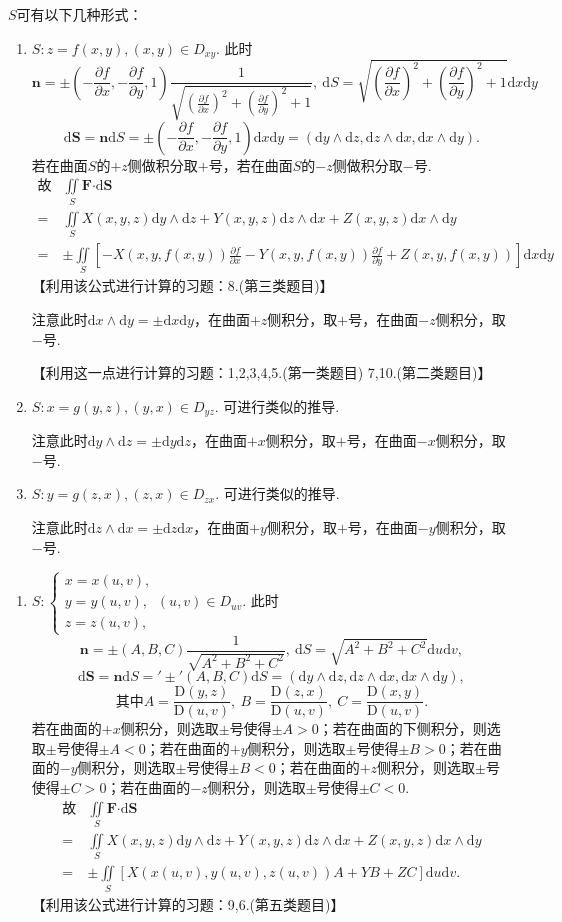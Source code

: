 \documentclass[12pt,UTF8,fleqn]{ctexart}
\newcommand{\md}[1]{\mathrm d#1}
\newcommand{\BSIInt}[2]{\iint\limits_{#1}#2}
\newcommand{\pp}[2]{\frac{\partial #1}{\partial #2}}
\begin{document}
$S$可有以下几种形式：
\begin{enumerate}
\begin{enumerate}
\item$S:z=f(x,y),(x,y)\in D_{xy}$. 此时
\setlength{\mathindent}{0cm}
\[\bm n=\pm(-\pp fx,-\pp fy,1)\frac1{\sqrt{(\pp fx)^2+(\pp fy)^2+1}},\ \md S=\sqrt{(\pp fx)^2+(\pp fy)^2+1}\md x\md y\]
\[\md\bm S=\bm n\md S=\pm(-\pp fx,-\pp fy,1)\md x\md y=(\md y\wedge\md z,\md z\wedge\md x,\md x\wedge\md y).\]
若在曲面$S$的$+z$侧做积分取$+$号，若在曲面$S$的$-z$侧做积分取$-$号.
\setlength{\mathindent}{0cm}
\[\begin{aligned}
\text{故}&\BSIInt S{\bm F\bm\cdot\md\bm S}\\
=&\BSIInt S{X(x,y,z)\md y\wedge\md z+Y(x,y,z)\md z\wedge\md x+Z(x,y,z)\md x\wedge\md y}\\
=&\pm\BSIInt S{[-X(x,y,f(x,y))\pp fx-Y(x,y,f(x,y))\pp fy+Z(x,y,f(x,y))]\md x\md y}
\end{aligned}\]
【利用该公式进行计算的习题：8.(第三类题目)】

注意此时$\md x\wedge\md y=\pm\md x\md y$，在曲面$+z$侧积分，取$+$号，在曲面$-z$侧积分，取$-$号.

【利用这一点进行计算的习题：1,2,3,4,5.(第一类题目) 7,10.(第二类题目)】
\item$S:x=g(y,z),(y,x)\in D_{yz}$. 可进行类似的推导.

注意此时$\md y\wedge\md z=\pm\md y\md z$，在曲面$+x$侧积分，取$+$号，在曲面$-x$侧积分，取$-$号.
\item$S:y=g(z,x),(z,x)\in D_{zx}$. 可进行类似的推导.

注意此时$\md z\wedge\md x=\pm\md z\md x$，在曲面$+y$侧积分，取$+$号，在曲面$-y$侧积分，取$-$号.
\end{enumerate}
\begin{enumerate}
\item[]$S:\begin{cases}
x=x(u,v),\\
y=y(u,v),\\
z=z(u,v),
\end{cases}(u,v)\in D_{uv}$. 此时
\setlength{\mathindent}{0cm}
\[\bm n=\pm(A,B,C)\frac1{\sqrt{A^2+B^2+C^2}},\ \md S=\sqrt{A^2+B^2+C^2}\md u\md v,\]
\[\md\bm S=\bm n\md S='\pm'(A,B,C)\md S=(\md y\wedge\md z,\md z\wedge\md x,\md x\wedge\md y),\]
\[\text{其中}A=\frac{\mathrm D(y,z)}{\mathrm D(u,v)},\ B=\frac{\mathrm D(z,x)}{\mathrm D(u,v)},\ C=\frac{\mathrm D(x,y)}{\mathrm D(u,v)}.\]
若在曲面的$+x$侧积分，则选取$\pm$号使得$\pm A>0$；若在曲面的下侧积分，则选取$\pm$号使得$\pm A<0$；若在曲面的$+y$侧积分，则选取$\pm$号使得$\pm B>0$；若在曲面的$-y$侧积分，则选取$\pm$号使得$\pm B<0$；若在曲面的$+z$侧积分，则选取$\pm$号使得$\pm C>0$；若在曲面的$-z$侧积分，则选取$\pm$号使得$\pm C<0$.
\setlength{\mathindent}{0cm}
\[\begin{aligned}
\text{故}&\BSIInt S{\bm F\bm\cdot\md\bm S}\\
=&\BSIInt S{X(x,y,z)\md y\wedge\md z+Y(x,y,z)\md z\wedge\md x+Z(x,y,z)\md x\wedge\md y}\\
=&\pm\BSIInt S{[X(x(u,v),y(u,v),z(u,v))A+YB+ZC]\md u\md v}.
\end{aligned}\]
【利用该公式进行计算的习题：9,6.(第五类题目)】


\end{enumerate}
\end{enumerate}
\end{document}
